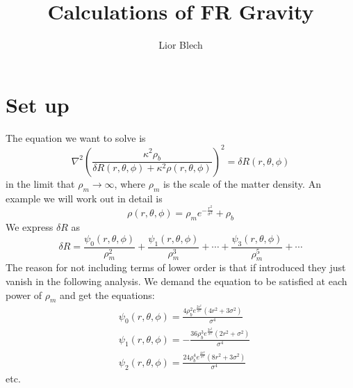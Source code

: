\documentclass[10pt,a4paper]{report}
\author{Lior Blech}
\title{Calculations of FR Gravity}
\begin{document}
\section{Set up}
The equation we want to solve is
\begin{equation}
\nabla^2\left(\frac{\kappa^2 \rho_b}{\delta R(r,\theta ,\phi)+\kappa^2 \rho (r,\theta ,\phi)}\right)^2=\delta R(r,\theta ,\phi)
\end{equation}
in the limit that $\rho_m\rightarrow\infty$, where $\rho_m$ is the scale of the matter density. An example we will work out in detail is 
\begin{equation}
\rho(r,\theta,\phi)=\rho_m e^{-\frac{r^2}{\sigma^2}}+\rho_b
\end{equation}
We express $\delta R$ as
\begin{equation}
\delta R=\frac{\psi_0(r,\theta,\phi)}{\rho_m^2}+\frac{\psi_1(r,\theta,\phi)}{\rho_m^3}+\cdots+\frac{\psi_3(r,\theta,\phi)}{\rho_m^5}+\cdots
\end{equation}
The reason for not including terms of lower order is that if introduced they just vanish in the following analysis. We demand the equation to be satisfied at each power of $\rho_m$ and get the equations:
\begin{subequations}
\begin{align}
&\psi_0(r,\theta ,\phi)=\frac{4\rho_b^2 e^{\frac{2 r^2}{\sigma^2}} \left(4 r^2+3\sigma^2\right)}{\sigma^4}\\
&\psi_1(r,\theta ,\phi)=-\frac{36\rho_b^3 e^{\frac{3r^2}{\sigma^2}} \left(2r^2+\sigma^2\right)}{\sigma^4}\\
&\psi_2(r,\theta ,\phi)=\frac{24\rho_b^4 e^{\frac{4r^2}{\sigma^2}} \left(8r^2+3\sigma^2\right)}{\sigma^4}
\end{align}
\end{subequations}
etc.
\end{document}
